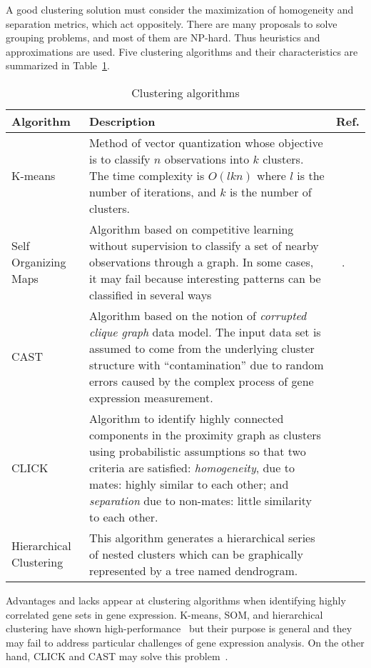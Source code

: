 \documentclass[a4paper,conference]{IEEEtran}
\begin{document}
A good clustering solution must consider the maximization of homogeneity and separation metrics, which act oppositely. There are many proposals to solve grouping problems, and most of them are NP-hard. Thus heuristics and approximations are used. Five clustering algorithms and their characteristics are summarized in Table~\ref{Clustering_alg}.

\begin{table}[!h]
\renewcommand{\arraystretch}{1.5}
\caption{Clustering algorithms}
\label{Clustering_alg}
\centering
\begin{tabular}{p{2cm}|p{5.4cm}|p{0.3cm}} 
\hline
\bfseries Algorithm & \bfseries Description & Ref. \\
\hline
K-means & Method of vector quantization whose objective is to classify $n$ observations into $k$ clusters. The time complexity is $O(lkn)$ where $l$ is the number of iterations, and $k$ is the number of clusters. &~\cite{levine2015data} \\
\hline
Self Organizing Maps & Algorithm based on competitive learning without supervision to classify a set of nearby observations through a graph. In some cases, it may fail because interesting patterns can be classified in several ways~\cite{k2015analysis} &~\cite{tamayo1999interpreting}. \\
\hline
CAST & Algorithm based on the notion of \textit{corrupted clique graph} data model. The input data set is assumed to come from the underlying cluster structure with ``contamination'' due to random errors caused by the complex process of gene expression measurement. &~\cite{bellaachia2002cast}\\
\hline
CLICK & Algorithm to identify highly connected components in the proximity graph as clusters using probabilistic assumptions so that two criteria are satisfied: \textit{homogeneity}, due to mates: highly similar to each other; and \textit{separation} due to non-mates: little similarity to each other. &~\cite{conesa2016survey} \\
\hline
Hierarchical Clustering & This algorithm generates a hierarchical series of nested clusters which can be graphically represented by a tree named dendrogram. &~\cite{galili2015dendextend} \\
\hline
\end{tabular}
\end{table}

Advantages and lacks appear at clustering algorithms when identifying highly correlated gene sets in gene expression. K-means, SOM, and hierarchical clustering have shown high-performance~\cite{weber2016comparison} but their purpose is general and they may fail to address particular challenges of gene expression analysis.
On the other hand, CLICK and CAST may solve this problem~\cite{salazar2016gene}.  
\end{document}
